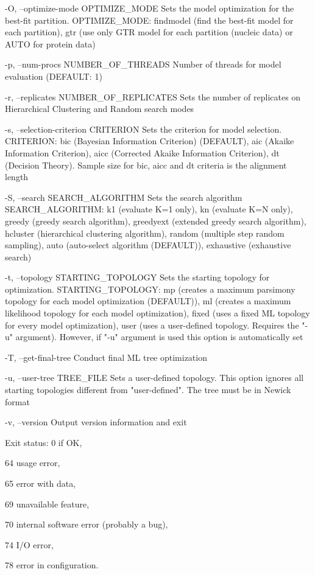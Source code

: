 \documentclass[11pt,twoside,a4paper]{article}
\begin{document}
       -O, --optimize-mode OPTIMIZE\_MODE
              Sets  the  model optimization for the best-fit partition. OPTIMIZE\_MODE: findmodel (find the best-fit model for each partition), gtr (use only GTR model for each partition (nucleic data)
              or AUTO for protein data)
              
       -p, --num-procs NUMBER\_OF\_THREADS
              Number of threads for model evaluation (DEFAULT: 1)

       -r, --replicates NUMBER\_OF\_REPLICATES
              Sets the number of replicates on Hierarchical Clustering and Random search modes

       -s, --selection-criterion CRITERION
              Sets the criterion for model selection. CRITERION: bic (Bayesian Information Criterion) (DEFAULT), aic (Akaike Information Criterion), aicc (Corrected Akaike Information  Criterion),  dt
              (Decision Theory). Sample size for bic, aicc and dt criteria is the alignment length

       -S, --search SEARCH\_ALGORITHM
              Sets  the  search  algorithm  SEARCH\_ALGORITHM:  k1  (evaluate K=1 only), kn (evaluate K=N only), greedy (greedy search algorithm), greedyext (extended greedy search algorithm), hcluster
              (hierarchical clustering algorithm), random (multiple step random sampling), auto (auto-select algorithm (DEFAULT)), exhaustive (exhaustive search)

       -t, --topology STARTING\_TOPOLOGY
              Sets the starting topology for optimization. STARTING\_TOPOLOGY: mp (creates a maximum parsimony topology for each model optimization (DEFAULT)), ml (creates a maximum likelihood topology
              for each model optimization), fixed (uses a fixed ML topology for every model optimization), user (uses a user-defined topology. Requires the "-u" argument). However, if "-u" argument is
              used this option is automatically set

       -T, --get-final-tree
              Conduct final ML tree optimization

       -u, --user-tree TREE\_FILE
              Sets a user-defined topology. This option ignores all starting topologies different from "user-defined". The tree must be in Newick format

       -v, --version
              Output version information and exit

   Exit status:
       0      if OK,

       64     usage error,

       65     error with data,

       69     unavailable feature,

       70     internal software error (probably a bug),

       74     I/O error,

       78     error in configuration.

%
%
%
%
%


\end{document}

